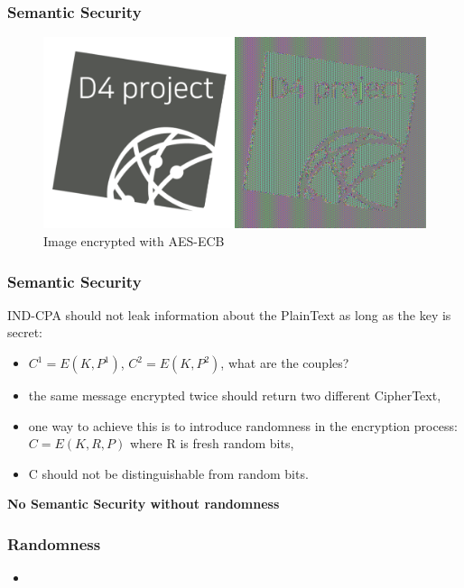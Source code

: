 \documentclass{beamer}
\begin{document}
\begin{frame}
        \frametitle{Semantic Security}
        \begin{figure}
          \centering
          \includegraphics[width=\textwidth]{d4-ecb.pdf}
          \caption{Image encrypted with AES-ECB}
        \end{figure}
        
\end{frame}


\begin{frame}
        \frametitle{Semantic Security}

        IND-CPA should not leak information about the PlainText as long as the
        key is secret:

        \begin{itemize}
          \item $C^1 = E(K, P^1)$, $C^2 = E(K, P^2)$, what are the couples?
          \item the same message encrypted twice should return two different CipherText,
          \item one way to achieve this is to introduce randomness in the
            encryption process: $C = E(K ,R ,P )$ where R is fresh random bits,
          \item C should not be distinguishable from random bits.
        \end{itemize}

        {\bf No Semantic Security without randomness}

\end{frame}

\begin{frame}
        \frametitle{Randomness}

        \begin{itemize}
          \item
        \end{itemize}

\end{frame}
\end{document}
